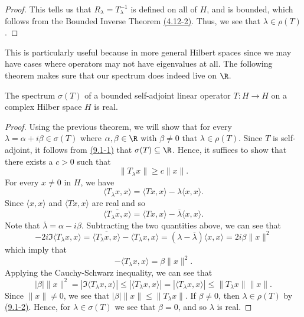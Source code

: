 \begin{proof}
This tells us that \( {R}_{\lambda} = T^{-1}_{\lambda} \) is defined on all of \( H  \), and is bounded, which follows from the Bounded Inverse Theorem {\hyperref[(4.12-2)]{(4.12-2)}}. Thus, we see that \( \lambda \in \rho(T) \).
\end{proof}

This is particularly useful because in more general Hilbert spaces since we may have cases where operators may not have eigenvalues at all. The following theorem makes sure that our spectrum does indeed live on \( \R  \).

\begin{theorem}[Spectrum]
    The spectrum \( \sigma(T) \) of a bounded self-adjoint linear operator \( T: H \to H  \) on a complex Hilber space \( H  \) is real. 
\end{theorem}
\begin{proof}
    Using the previous theorem, we will show that for every \( \lambda = \alpha + i \beta \in \sigma(T)  \) where \( \alpha, \beta \in \R  \) with \( \beta \neq 0  \) that \( \lambda \in \rho(T) \). Since \( T \) is self-adjoint, it follows from {\hyperref[(9,1-1)]{(9.1-1)}} that \( \sigma(T) \subseteq \R  \). Hence, it suffices to show that there exists a \( c > 0  \) such that \[  \|{T}_{\lambda}x\| \geq c \|x \|. \tag{*} \] 
    For every \( x \neq 0  \) in \( H  \), we have 
    \[  \langle {T}_{\lambda}x  , x  \rangle = \langle Tx  ,  x  \rangle - \lambda \langle x , x  \rangle. \]
    Since \( \langle x , x \rangle  \) and \( \langle Tx , x  \rangle  \) are real and so 
    \[  \overline{\langle {T}_{\lambda}x  ,  x  \rangle} = \langle Tx  ,  x  \rangle - \overline{\lambda } \langle x , x \rangle.  \]
    Note that \( \overline{\lambda} = \alpha - i \beta  \). Subtracting the two quantities above, we can see that 
    \[ -2i \Im \langle {T}_{\lambda}x  , x  \rangle =  \overline{\langle {T}_{\lambda}x  ,  x  \rangle } - \langle {T}_{\lambda}x  ,  x  \rangle = (\lambda - \overline{\lambda}) \langle x , x \rangle = 2 i \beta \|x\|^{2} \]
    which imply that 
    \[  - \langle {T}_{\lambda}x  ,  x  \rangle = \beta \|x\|^{2}. \]
    Applying the Cauchy-Schwarz inequality, we can see that 
    \[  | \beta | \|x\|^{2} = | \Im \langle {T}_{\lambda}x  ,  x \rangle | \leq | \langle {T}_{\lambda}x  ,  x  \rangle | = | \langle {T}_{\lambda}x  ,  x  \rangle  |  \leq \|{T}_{\lambda}x \| \|x\|. \]
    Since \( \|x \| \neq 0  \), we see that \( | \beta  | \|x \| \leq \|{T}_{\lambda}x \| \). If \( \beta \neq 0  \), then \( \lambda \in \rho(T) \) by {\hyperref[(9.1-2)]{(9.1-2)}}. Hence, for \( \lambda \in \sigma(T) \) we see that \( \beta = 0  \), and so \( \lambda  \) is real. 
    
\end{proof}

